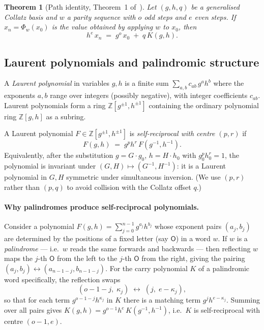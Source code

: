 \documentclass[12pt]{article}
\newtheorem{theorem}{Theorem}[section]
\theoremstyle{definition}
\theoremstyle{remark}
\theoremstyle{plain}
\newcommand{\ZZ}{\mathbb{Z}}
\newcommand{\OO}{\mathsf{O}}
\begin{document}
\begin{theorem}[Path identity, Theorem~1 of~\cite{paper71}]
\label{thm:path-identity}
Let $(g, h, q)$ be a generalised Collatz basis and $w$ a parity sequence with
$o$ odd steps and $e$ even steps.
If $x_n = \Phi_w(x_0)$ is the value obtained by applying $w$ to $x_0$, then
\[
  h^e\,x_n \;=\; g^o\,x_0 \;+\; q\,K(g, h).
\]
\end{theorem}

\subsection{Laurent polynomials and palindromic structure}
\label{sec:laurent-prelim}

A \emph{Laurent polynomial} in variables $g, h$ is a finite sum
$\sum_{a,b} c_{ab}\, g^a h^b$ where the exponents $a, b$ range over integers
(possibly negative), with integer coefficients $c_{ab}$.
Laurent polynomials form a ring $\ZZ[g^{\pm 1}, h^{\pm 1}]$ containing the
ordinary polynomial ring $\ZZ[g, h]$ as a subring.

A Laurent polynomial $F \in \ZZ[g^{\pm 1}, h^{\pm 1}]$ is \emph{self-reciprocal
with centre $(p, r)$} if
\[
  F(g, h) \;=\; g^p h^r\, F(g^{-1}, h^{-1}).
\]
Equivalently, after the substitution $g = G \cdot g_0$, $h = H \cdot h_0$ with
$g_0^p h_0^r = 1$, the polynomial is invariant under $(G, H) \mapsto (G^{-1}, H^{-1})$:
it is a Laurent polynomial in $G, H$ symmetric under simultaneous inversion.
(We use $(p, r)$ rather than $(p, q)$ to avoid collision with the Collatz offset $q$.)

\paragraph{Why palindromes produce self-reciprocal polynomials.}
Consider a polynomial $F(g,h) = \sum_{j=0}^{n-1} g^{a_j} h^{b_j}$ whose exponent
pairs $(a_j, b_j)$ are determined by the positions of a fixed letter (say $\OO$)
in a word $w$.
If $w$ is a \emph{palindrome} --- i.e.\ $w$ reads the same forwards and backwards ---
then reflecting $w$ maps the $j$-th $\OO$ from the left to the $j$-th $\OO$ from the
right, giving the pairing $(a_j, b_j) \leftrightarrow (a_{n-1-j}, b_{n-1-j})$.
For the carry polynomial $K$ of a palindromic word specifically, the reflection swaps
\[
  (o-1-j,\; \kappa_j) \;\longleftrightarrow\; (j,\; e-\kappa_j),
\]
so that for each term $g^{o-1-j} h^{\kappa_j}$ in $K$ there is a matching term
$g^j h^{e-\kappa_j}$.
Summing over all pairs gives $K(g,h) = g^{o-1} h^{e}\, K(g^{-1}, h^{-1})$, i.e.\
$K$ is self-reciprocal with centre $(o-1, e)$.
\end{document}
